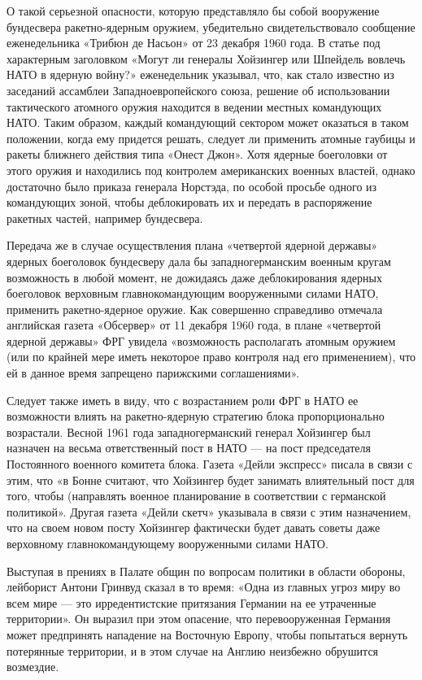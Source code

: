 \documentclass[12pt, a4paper, openany]{book}
\begin{document}
	О такой серьезной опасности, которую представляло бы собой вооружение бундесвера ракетно-ядерным оружием, убедительно свидетельствовало сообщение еженедельника «Трибюн де Насьон» от 23 декабря 1960 года. В статье под характерным заголовком «Могут ли генералы Хойзингер или Шпейдель вовлечь НАТО в ядерную войну?» еженедельник указывал, что, как стало известно из заседаний ассамблеи Западноевропейского союза, решение об использовании тактического атомного оружия находится в ведении местных командующих НАТО. Таким образом, каждый командующий сектором может оказаться в таком положении, когда ему придется решать, следует ли применить атомные гаубицы и ракеты ближнего действия типа «Онест Джон». Хотя ядерные боеголовки от этого оружия и находились под контролем американских военных властей, однако достаточно было приказа генерала Норстэда, по особой просьбе одного из командующих зоной, чтобы деблокировать их и передать в распоряжение ракетных частей, например бундесвера.
	
	Передача же в случае осуществления плана «четвертой ядерной державы» ядерных боеголовок бундесверу дала бы западногерманским военным кругам возможность в любой момент, не дожидаясь даже деблокирования ядерных боеголовок верховным главнокомандующим вооруженными силами НАТО, применить ракетно-ядерное оружие. Как совершенно справедливо отмечала английская газета «Обсервер» от 11 декабря 1960 года, в плане «четвертой ядерной державы» ФРГ увидела «возможность располагать атомным оружием (или по крайней мере иметь некоторое право контроля над его применением), что ей в данное время запрещено парижскими соглашениями».
	
	Следует также иметь в виду, что с возрастанием роли ФРГ в НАТО ее возможности влиять на ракетно-ядерную стратегию блока пропорционально возрастали. Весной 1961 года западногерманский генерал Хойзингер был назначен на весьма ответственный пост в НАТО — на пост председателя Постоянного военного комитета блока. Газета «Дейли экспресс» писала в связи с этим, что «в Бонне считают, что Хойзингер будет занимать влиятельный пост для того, чтобы (направлять военное планирование в соответствии с германской политикой». Другая газета «Дейли скетч» указывала в связи с этим назначением, что на своем новом посту Хойзингер фактически будет давать советы даже верховному главнокомандующему вооруженными силами НАТО.
	
	Выступая в прениях в Палате общин по вопросам политики в области обороны, лейборист Антони Гринвуд сказал в то время: «Одна из главных угроз миру во всем мире — это ирредентистские притязания Германии на ее утраченные территории». Он выразил при этом опасение, что перевооруженная Германия может предпринять нападение на Восточную Европу, чтобы попытаться вернуть потерянные территории, и в этом случае на Англию неизбежно обрушится возмездие.
	
\end{document}
